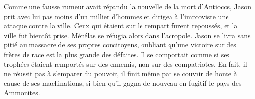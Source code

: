 Comme une fausse rumeur avait répandu la nouvelle de la mort d’Antiocos,
	Jason prit avec lui pas moins d’un millier d’hommes
	et dirigea à l’improviste une attaque contre la ville.
Ceux qui étaient sur le rempart furent repoussés, et la ville fut bientôt prise.
	Ménélas se réfugia alors dans l’acropole.
Jason se livra sans pitié au massacre de ses propres concitoyens,
	oubliant qu’une victoire sur des frères de race est la plus grande des défaites.
Il se comportait comme si ses trophées étaient remportés sur des ennemis,
	non sur des compatriotes.
En fait, il ne réussit pas à s’emparer du pouvoir,
	il finit même par se couvrir de honte à cause de ses machinations,
	si bien qu’il gagna de nouveau en fugitif le pays des Ammonites.
